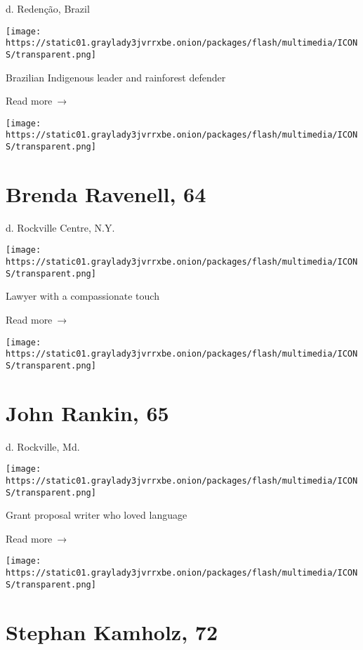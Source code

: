 d. Redenção, Brazil

\texttt{[image: https://static01.graylady3jvrrxbe.onion/packages/flash/multimedia/ICONS/transparent.png]}

Brazilian Indigenous leader and rainforest defender

 Read more~→

\href{https://www.nytimes3xbfgragh.onion/2020/06/23/nyregion/brenda-ravenell-dead-coronavirus.html}{}

\texttt{[image: https://static01.graylady3jvrrxbe.onion/packages/flash/multimedia/ICONS/transparent.png]}

\hypertarget{brenda-ravenell-64}{%
\section{Brenda Ravenell, 64}\label{brenda-ravenell-64}}

d. Rockville Centre, N.Y.

\texttt{[image: https://static01.graylady3jvrrxbe.onion/packages/flash/multimedia/ICONS/transparent.png]}

Lawyer with a compassionate touch

 Read more~→

\href{https://www.nytimes3xbfgragh.onion/2020/06/22/obituaries/22john-rankin-dead.html}{}

\texttt{[image: https://static01.graylady3jvrrxbe.onion/packages/flash/multimedia/ICONS/transparent.png]}

\hypertarget{john-rankin-65}{%
\section{John Rankin, 65}\label{john-rankin-65}}

d. Rockville, Md.

\texttt{[image: https://static01.graylady3jvrrxbe.onion/packages/flash/multimedia/ICONS/transparent.png]}

Grant proposal writer who loved language

 Read more~→

\href{https://www.nytimes3xbfgragh.onion/2020/06/22/nyregion/stephan-kamholz-dead-coronavirus.html}{}

\texttt{[image: https://static01.graylady3jvrrxbe.onion/packages/flash/multimedia/ICONS/transparent.png]}

\hypertarget{stephan-kamholz-72}{%
\section{Stephan Kamholz, 72}\label{stephan-kamholz-72}}

